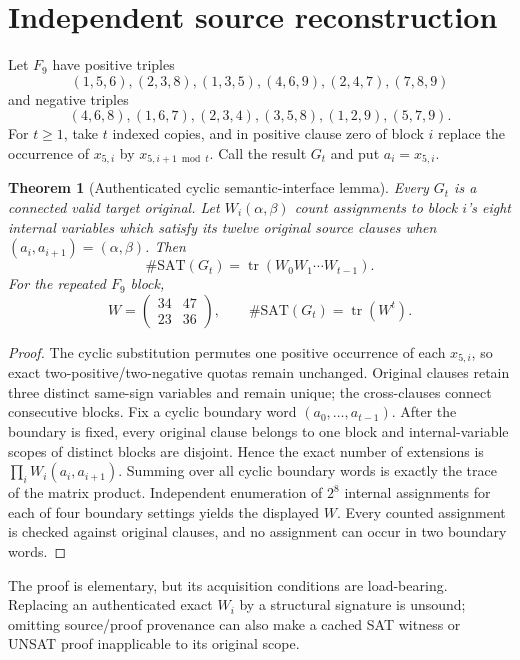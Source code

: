 \documentclass[11pt]{article}
\newtheorem{theorem}{Theorem}
\begin{document}
\section{Independent source reconstruction}
Let $F_9$ have positive triples
\[
(1,5,6),(2,3,8),(1,3,5),(4,6,9),(2,4,7),(7,8,9)
\]
and negative triples
\[
(4,6,8),(1,6,7),(2,3,4),(3,5,8),(1,2,9),(5,7,9).
\]
For $t\ge1$, take $t$ indexed copies, and in positive clause zero of block $i$ replace the occurrence of $x_{5,i}$ by $x_{5,i+1\bmod t}$.  Call the result $G_t$ and put $a_i=x_{5,i}$.

\begin{theorem}[Authenticated cyclic semantic-interface lemma]\label{thm:transfer}
Every $G_t$ is a connected valid target original.  Let $W_i(\alpha,\beta)$ count assignments to block $i$'s eight internal variables which satisfy its twelve original source clauses when $(a_i,a_{i+1})=(\alpha,\beta)$.  Then
\[
 \#\mathrm{SAT}(G_t)=\operatorname{tr}(W_0W_1\cdots W_{t-1}).
\]
For the repeated $F_9$ block,
\[
 W=\begin{pmatrix}34&47\\23&36\end{pmatrix},\qquad
 \#\mathrm{SAT}(G_t)=\operatorname{tr}(W^t).
\]
\end{theorem}
\begin{proof}
The cyclic substitution permutes one positive occurrence of each $x_{5,i}$, so exact two-positive/two-negative quotas remain unchanged.  Original clauses retain three distinct same-sign variables and remain unique; the cross-clauses connect consecutive blocks.  Fix a cyclic boundary word $(a_0,\ldots,a_{t-1})$.  After the boundary is fixed, every original clause belongs to one block and internal-variable scopes of distinct blocks are disjoint.  Hence the exact number of extensions is
\(
\prod_iW_i(a_i,a_{i+1}).
\)
Summing over all cyclic boundary words is exactly the trace of the matrix product.  Independent enumeration of $2^8$ internal assignments for each of four boundary settings yields the displayed $W$.  Every counted assignment is checked against original clauses, and no assignment can occur in two boundary words.
\end{proof}

The proof is elementary, but its acquisition conditions are load-bearing.  Replacing an authenticated exact $W_i$ by a structural signature is unsound; omitting source/proof provenance can also make a cached SAT witness or UNSAT proof inapplicable to its original scope.
\end{document}
